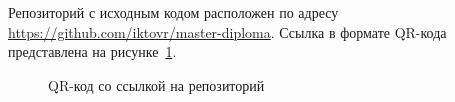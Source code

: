 
Репозиторий с исходным кодом расположен по адресу \url{https://github.com/iktovr/master-diploma}.
Ссылка в формате QR-кода представлена на рисунке~\ref{fig:qr}.

\begin{figure}
\caption{QR-код со ссылкой на репозиторий}
\label{fig:qr}
\end{figure}
